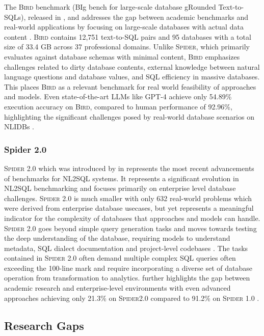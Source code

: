 \documentclass{article}
\begin{document}
The \textsc{Bird} benchmark (BIg bench for large-scale database gRounded Text-to-SQLs), released in \citeyear{BIRD},
and addresses the gap between academic benchmarks and real-world applications by focusing on large-scale databases
with actual data content \citep{BIRD}. \textsc{Bird} contains 12,751 text-to-SQL pairs and 95 databases with a total
size of 33.4 GB across 37 professional domains. Unlike \textsc{Spider}, which primarily evaluates against database
schemas with minimal content, \textsc{Bird} emphasizes challenges related to dirty database contents, external
knowledge between natural language questions and database values, and SQL efficiency in massive databases. This
places \textsc{Bird} as a relevant benchmark for real world feasibility of approaches and models. Even state-of-the-art
LLMs like GPT-4 achieve only 54.89\% execution accuracy on \textsc{Bird}, compared to human performance of 92.96\%,
highlighting the significant challenges posed by real-world database scenarios on NLIDBs \citep{BIRD}.

\subsubsection{Spider 2.0}

\textsc{Spider 2.0} which was introduced by \citeauthor*{Spider2} in \citeyear{Spider2} represents the most recent
advancements of benchmarks for NL2SQL systems. It represents a significant evolution in NL2SQL benchmarking and focuses
primarily on enterprise level database challenges. \textsc{Spider 2.0} is much smaller with only 632 real-world problems
which were derived from enterprise database usecases, but yet represents a meaningful indicator for the complexity of
databases that approaches and models can handle. \textsc{Spider 2.0} goes beyond simple query generation tasks and moves
towards testing the deep understanding of the database, requiring models to understand metadata, SQL dialect documentation
and project-level codebases \citep{Spider2}. The tasks contained in \textsc{Spider 2.0} often demand multiple complex SQL
queries often exceeding the 100-line mark and require incorporating a diverse set of database operation from transformation
to analytics. \citeauthor{Spider2} further highlights the gap between academic research and enterprise-level environments
with even advanced approaches achieving only 21.3\% on \textsc{Spider2.0} compared to 91.2\% on \textsc{Spider 1.0}
\citep{Spider, Spider2}.

\subsection{Research Gaps}
\end{document}
